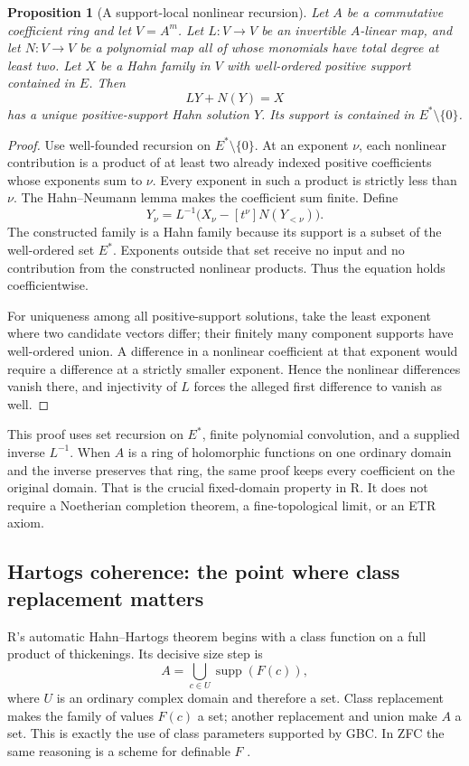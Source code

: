 \documentclass[11pt,letterpaper]{article}
\numberwithin{equation}{section}
\newtheorem{proposition}[theorem]{Proposition}
\theoremstyle{definition}
\theoremstyle{remark}
\newcommand{\supp}{\operatorname{supp}}
\begin{document}
\begin{proposition}[A support-local nonlinear recursion]\label{prop:positive}
Let $A$ be a commutative coefficient ring and let $V=A^m$. Let $L:V\to V$ be an invertible $A$-linear map, and let $N:V\to V$ be a polynomial map all of whose monomials have total degree at least two. Let $X$ be a Hahn family in $V$ with well-ordered positive support contained in $E$. Then
\[
LY+N(Y)=X
\]
has a unique positive-support Hahn solution $Y$. Its support is contained in $E^*\setminus\{0\}$.
\end{proposition}
\begin{proof}
Use well-founded recursion on $E^*\setminus\{0\}$. At an exponent $\nu$, each nonlinear contribution is a product of at least two already indexed positive coefficients whose exponents sum to $\nu$. Every exponent in such a product is strictly less than $\nu$. The Hahn--Neumann lemma makes the coefficient sum finite. Define
\[
Y_\nu=L^{-1}\bigl(X_\nu-[t^\nu]N(Y_{<\nu})\bigr).
\]
The constructed family is a Hahn family because its support is a subset of the well-ordered set $E^*$. Exponents outside that set receive no input and no contribution from the constructed nonlinear products. Thus the equation holds coefficientwise.

For uniqueness among all positive-support solutions, take the least exponent where two candidate vectors differ; their finitely many component supports have well-ordered union. A difference in a nonlinear coefficient at that exponent would require a difference at a strictly smaller exponent. Hence the nonlinear differences vanish there, and injectivity of $L$ forces the alleged first difference to vanish as well.
\end{proof}
This proof uses set recursion on $E^*$, finite polynomial convolution, and a supplied inverse $L^{-1}$. When $A$ is a ring of holomorphic functions on one ordinary domain and the inverse preserves that ring, the same proof keeps every coefficient on the original domain. That is the crucial fixed-domain property in R. It does not require a Noetherian completion theorem, a fine-topological limit, or an ETR axiom.

\subsection{Hartogs coherence: the point where class replacement matters}
R's automatic Hahn--Hartogs theorem begins with a class function on a full product of thickenings. Its decisive size step is
\[
A=\bigcup_{c\in U}\supp(F(c)),
\]
where $U$ is an ordinary complex domain and therefore a set. Class replacement makes the family of values $F(c)$ a set; another replacement and union make $A$ a set. This is exactly the use of class parameters supported by GBC. In ZFC the same reasoning is a scheme for definable $F$ \cite{SourceR}.
\end{document}
